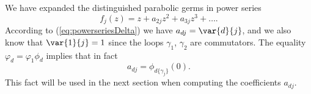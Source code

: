 \begin{remark}\label{rmk:a_dj=phi_d} 
We have expanded the distinguished parabolic germs in power series
\[ f_j(z)=z+a_{2j}z^2+a_{3j}z^3+\ldots. \]
According to (\ref{eq:powerseriesDelta}) we have $a_{dj}=\var{d}{j}$, and we also know that $\var{1}{j}=1$ since the loops $\gamma_1$, $\gamma_2$ are commutators. The equality $\varphi_d=\varphi_1\phi_d$ implies that in fact
\[ a_{dj}=\phi_{d\{\gamma_j\}}(0). \]
This fact will be used in the next section when computing the coefficients $a_{dj}$.
\end{remark}



































